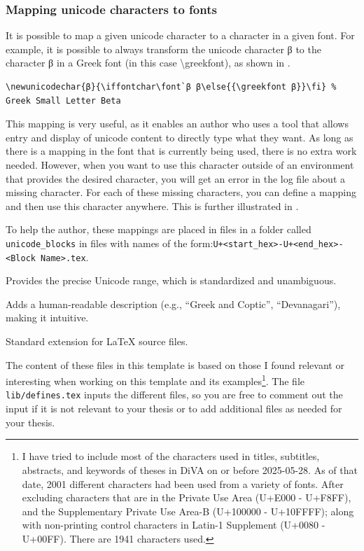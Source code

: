 \documentclass[12pt, twoside]{article}
\begin{document}
\subsubsection{Mapping unicode characters to fonts}

It is possible to map a given unicode character to a character in a given font. For example, it is possible to always transform the unicode character β to the character β in a Greek font (in this case \textbackslash greekfont), as shown in .
\begin{lstlisting}[style=latexExampleForAuthors, caption={Mapping the unicode β character to a particular character in the greekfont}, label=lst:MappingbetaToGreekfont]
\newunicodechar{β}{\iffontchar\font`β β\else{{\greekfont β}}\fi} % Greek Small Letter Beta
\end{lstlisting}

This mapping is very useful, as it enables an author who uses a tool that allows entry and display of unicode content to directly type what they want. As long as there is a mapping in the font that is currently being used, there is no extra work needed. However, when you want to use this character outside of an environment that provides the desired character, you will get an error in the log file about a missing character. For each of these missing characters, you can define a mapping and then use this character anywhere. This is further illustrated in .

To help the author, these mappings are placed in files in a folder called \texttt{unicode\_blocks} in files with names of the form:\linebreak[4]
\texttt{U+<start\_hex>-U+<end\_hex>-<Block Name>.tex}.
\begin{description}[labelwidth =\widthof{\textbf{U+<start\_hex>-U+<end\_hex>}}, leftmargin = !]
    \item[U+<start\_hex>-U+<end\_hex>] Provides the precise Unicode range, which is standardized and unambiguous.
\item[<Block Name>] Adds a human-readable description (e.g., \enquote{Greek and Coptic}, \enquote{Devanagari}), making it intuitive.
\item[.tex] Standard extension for LaTeX source files.
\end{description}

The content of these files in this template is based on those I found relevant or interesting when working on this template and its examples\footnote{I have tried to include most of the characters used in titles, subtitles, abstracts, and keywords of theses in \gls{DiVA} on or before 2025-05-28. As of that date, 2001 different characters had been used from a variety of fonts. After excluding characters that are in the Private Use Area (U+E000 - U+F8FF), and the Supplementary Private Use Area-B (U+100000 - U+10FFFF); along with non-printing control characters in Latin-1 Supplement (U+0080 - U+00FF). There are 1941 characters used.}. The file \texttt{lib/defines.tex} inputs the different files, so you are free to comment out the input if it is not relevant to your thesis or to add additional files as needed for your thesis.
\end{document}

